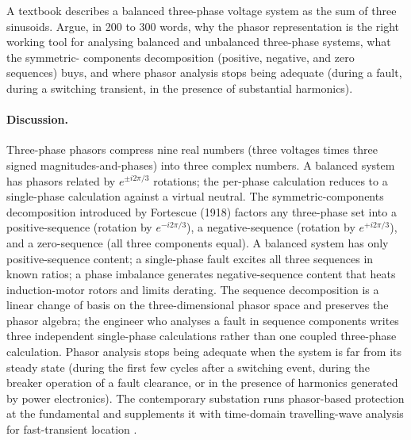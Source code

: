\begin{exercise}
A textbook describes a balanced three-phase voltage system as
the sum of three sinusoids. Argue, in 200 to 300 words, why the
phasor representation is the right working tool for analysing
balanced and unbalanced three-phase systems, what the symmetric-
components decomposition (positive, negative, and zero
sequences) buys, and where phasor analysis stops being adequate
(during a fault, during a switching transient, in the presence
of substantial harmonics).

\paragraph{Discussion.}
Three-phase phasors compress nine real numbers (three voltages
times three signed magnitudes-and-phases) into three complex
numbers. A balanced system has phasors related by $e^{\pm i 2\pi/3}$
rotations; the per-phase calculation reduces to a single-phase
calculation against a virtual neutral. The symmetric-components
decomposition introduced by Fortescue (1918) factors any
three-phase set into a positive-sequence (rotation by
$e^{-i 2\pi/3}$), a negative-sequence (rotation by $e^{+i 2\pi/3}$),
and a zero-sequence (all three components equal). A balanced
system has only positive-sequence content; a single-phase fault
excites all three sequences in known ratios; a phase imbalance
generates negative-sequence content that heats induction-motor
rotors and limits derating. The sequence decomposition is a
linear change of basis on the three-dimensional phasor space and
preserves the phasor algebra; the engineer who analyses a fault
in sequence components writes three independent single-phase
calculations rather than one coupled three-phase calculation.
Phasor analysis stops being adequate when the system is far from
its steady state (during the first few cycles after a switching
event, during the breaker operation of a fault clearance, or in
the presence of harmonics generated by power electronics). The
contemporary substation runs phasor-based protection at the
fundamental and supplements it with time-domain travelling-wave
analysis for fast-transient location \cite{paper:v2ch03-itrich-c37-118}.
\end{exercise}
